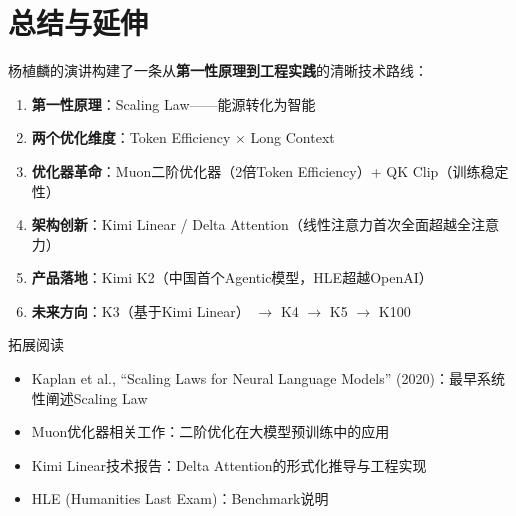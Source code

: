 \section{总结与延伸}

杨植麟的演讲构建了一条从\textbf{第一性原理到工程实践}的清晰技术路线：

\begin{enumerate}
\item \textbf{第一性原理}：Scaling Law——能源转化为智能
\item \textbf{两个优化维度}：Token Efficiency $\times$ Long Context
\item \textbf{优化器革命}：Muon二阶优化器（2倍Token Efficiency）+ QK Clip（训练稳定性）
\item \textbf{架构创新}：Kimi Linear / Delta Attention（线性注意力首次全面超越全注意力）
\item \textbf{产品落地}：Kimi K2（中国首个Agentic模型，HLE超越OpenAI）
\item \textbf{未来方向}：K3（基于Kimi Linear） $\rightarrow$ K4 $\rightarrow$ K5 $\rightarrow$ K100
\end{enumerate}

\begin{knowledgebox}{拓展阅读}
\begin{itemize}
\item Kaplan et al., ``Scaling Laws for Neural Language Models'' (2020)：最早系统性阐述Scaling Law
\item Muon优化器相关工作：二阶优化在大模型预训练中的应用
\item Kimi Linear技术报告：Delta Attention的形式化推导与工程实现
\item HLE (Humanities Last Exam)：Benchmark说明
\end{itemize}
\end{knowledgebox}



